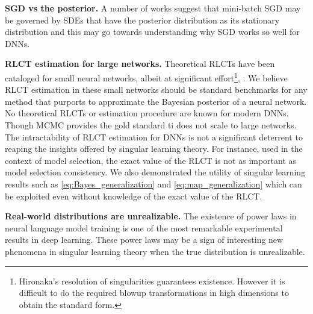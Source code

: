 \documentclass{article} %
\begin{document}
\textbf{SGD vs the posterior.} A number of works \citep{Simsekli17,mandt_stochastic_2018,smith_stochastic_2018} suggest that mini-batch SGD may be governed by SDEs that have the posterior distribution as its stationary distribution and this may go towards understanding why SGD works so well for DNNs. %

\textbf{RLCT estimation for large networks.} 
Theoretical RLCTs have been cataloged for small neural networks, albeit at significant effort\footnote{Hironaka's resolution of singularities guarantees existence. However it is difficult to do the required blowup transformations in high dimensions to obtain the standard form.}, \citep{aoyagi_stochastic_2005, aoyagi_resolution_2006}. We believe RLCT estimation in these small networks should be standard benchmarks for any method that purports to approximate the Bayesian posterior of a neural network.
No theoretical RLCTs or estimation procedure are known for modern DNNs. Though MCMC provides the gold standard ti does not scale to large networks.
The intractability of RLCT estimation for DNNs is not a significant deterrent to reaping the insights offered by singular learning theory. For instance, used in the context of model selection, the exact value of the RLCT is not as important as model selection consistency. We also demonstrated the utility of singular learning results such as \eqref{eq:Bayes_generalization} and \eqref{eq:map_generalization} which can be exploited even without knowledge of the exact value of the RLCT.

\textbf{Real-world distributions are unrealizable.}
The existence of power laws in neural language model training \citep{hestness_2017,kaplan2020scaling} is one of the most remarkable experimental results in deep learning. These power laws may be a sign of interesting new phenomena in singular learning theory when the true distribution is unrealizable.


\end{document}
